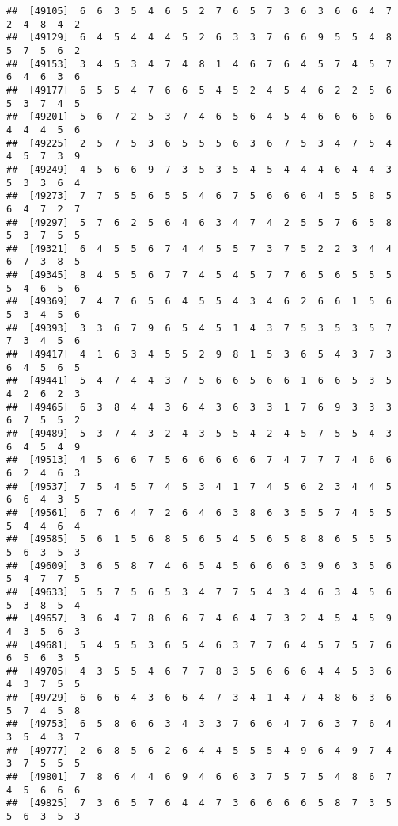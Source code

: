 \documentclass[
]{book}
\begin{document}
\begin{verbatim}
##  [49105]  6  6  3  5  4  6  5  2  7  6  5  7  3  6  3  6  6  4  7  2  4  8  4  2
##  [49129]  6  4  5  4  4  4  5  2  6  3  3  7  6  6  9  5  5  4  8  5  7  5  6  2
##  [49153]  3  4  5  3  4  7  4  8  1  4  6  7  6  4  5  7  4  5  7  6  4  6  3  6
##  [49177]  6  5  5  4  7  6  6  5  4  5  2  4  5  4  6  2  2  5  6  5  3  7  4  5
##  [49201]  5  6  7  2  5  3  7  4  6  5  6  4  5  4  6  6  6  6  6  4  4  4  5  6
##  [49225]  2  5  7  5  3  6  5  5  5  6  3  6  7  5  3  4  7  5  4  4  5  7  3  9
##  [49249]  4  5  6  6  9  7  3  5  3  5  4  5  4  4  4  6  4  4  3  5  3  3  6  4
##  [49273]  7  7  5  5  6  5  5  4  6  7  5  6  6  6  4  5  5  8  5  6  4  7  2  7
##  [49297]  5  7  6  2  5  6  4  6  3  4  7  4  2  5  5  7  6  5  8  5  3  7  5  5
##  [49321]  6  4  5  5  6  7  4  4  5  5  7  3  7  5  2  2  3  4  4  6  7  3  8  5
##  [49345]  8  4  5  5  6  7  7  4  5  4  5  7  7  6  5  6  5  5  5  5  4  6  5  6
##  [49369]  7  4  7  6  5  6  4  5  5  4  3  4  6  2  6  6  1  5  6  5  3  4  5  6
##  [49393]  3  3  6  7  9  6  5  4  5  1  4  3  7  5  3  5  3  5  7  7  3  4  5  6
##  [49417]  4  1  6  3  4  5  5  2  9  8  1  5  3  6  5  4  3  7  3  6  4  5  6  5
##  [49441]  5  4  7  4  4  3  7  5  6  6  5  6  6  1  6  6  5  3  5  4  2  6  2  3
##  [49465]  6  3  8  4  4  3  6  4  3  6  3  3  1  7  6  9  3  3  3  6  7  5  5  2
##  [49489]  5  3  7  4  3  2  4  3  5  5  4  2  4  5  7  5  5  4  3  6  4  5  4  9
##  [49513]  4  5  6  6  7  5  6  6  6  6  6  7  4  7  7  7  4  6  6  6  2  4  6  3
##  [49537]  7  5  4  5  7  4  5  3  4  1  7  4  5  6  2  3  4  4  5  6  6  4  3  5
##  [49561]  6  7  6  4  7  2  6  4  6  3  8  6  3  5  5  7  4  5  5  5  4  4  6  4
##  [49585]  5  6  1  5  6  8  5  6  5  4  5  6  5  8  8  6  5  5  5  5  6  3  5  3
##  [49609]  3  6  5  8  7  4  6  5  4  5  6  6  6  3  9  6  3  5  6  5  4  7  7  5
##  [49633]  5  5  7  5  6  5  3  4  7  7  5  4  3  4  6  3  4  5  6  5  3  8  5  4
##  [49657]  3  6  4  7  8  6  6  7  4  6  4  7  3  2  4  5  4  5  9  4  3  5  6  3
##  [49681]  5  4  5  5  3  6  5  4  6  3  7  7  6  4  5  7  5  7  6  6  5  6  3  5
##  [49705]  4  3  5  5  4  6  7  7  8  3  5  6  6  6  4  4  5  3  6  4  3  7  5  5
##  [49729]  6  6  6  4  3  6  6  4  7  3  4  1  4  7  4  8  6  3  6  5  7  4  5  8
##  [49753]  6  5  8  6  6  3  4  3  3  7  6  6  4  7  6  3  7  6  4  3  5  4  3  7
##  [49777]  2  6  8  5  6  2  6  4  4  5  5  5  4  9  6  4  9  7  4  3  7  5  5  5
##  [49801]  7  8  6  4  4  6  9  4  6  6  3  7  5  7  5  4  8  6  7  4  5  6  6  6
##  [49825]  7  3  6  5  7  6  4  4  7  3  6  6  6  6  5  8  7  3  5  5  6  3  5  3

\end{verbatim}
\end{document}
